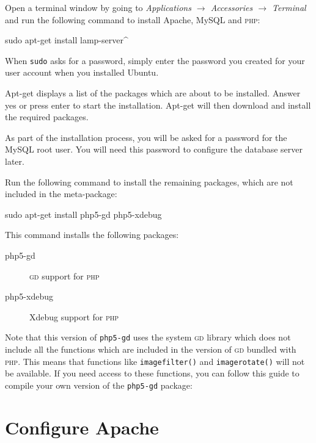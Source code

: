 \documentclass[final,ebook,10pt,twoside,openright]{memoir}
\begin{document}
Open a terminal window by going to \emph{Applications $\rightarrow$ Accessories $\rightarrow$ Terminal} and run the following command to install Apache, MySQL and \textsc{php}:

\begin{squashboxcommand}
sudo apt-get install lamp-server^
\end{squashboxcommand}

When \verb!sudo! asks for a password, simply enter the password you created for your user account when you installed Ubuntu.

Apt-get displays a list of the packages which are about to be installed. Answer yes or press enter to start the installation. Apt-get will then download and install the required packages.

As part of the installation process, you will be asked for a password for the MySQL root user. You will need this password to configure the database server later.

Run the following command to install the remaining packages, which are not included in the meta-package:

\begin{squashboxcommand}
sudo apt-get install php5-gd php5-xdebug
\end{squashboxcommand}

This command installs the following packages:

\begin{description}
\item[php5-gd] \textsc{gd} support for \textsc{php}
\item[php5-xdebug] Xdebug support for \textsc{php}
\end{description}

Note that this version of \verb!php5-gd! uses the system \textsc{gd} library which does not include all the functions which are included in the version of \textsc{gd} bundled with \textsc{php}. This means that functions like \verb!imagefilter()! and \verb!imagerotate()! will not be available. If you need access to these functions, you can follow this guide to compile your own version of the \verb!php5-gd! package:


\section{Configure Apache}
\label{sec:Configure Apache}
\end{document}
